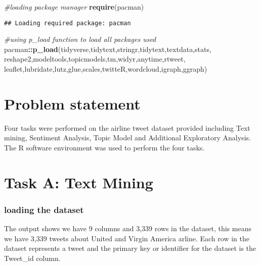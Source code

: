 \documentclass[
]{article}
\newenvironment{Shaded}{\begin{snugshade}}{\end{snugshade}}
\newcommand{\CommentTok}[1]{\textcolor[rgb]{0.56,0.35,0.01}{\textit{#1}}}
\newcommand{\KeywordTok}[1]{\textcolor[rgb]{0.13,0.29,0.53}{\textbf{#1}}}
\newcommand{\NormalTok}[1]{#1}
\newcommand{\OperatorTok}[1]{\textcolor[rgb]{0.81,0.36,0.00}{\textbf{#1}}}
\begin{document}
\begin{Shaded}
\begin{Highlighting}[]
\CommentTok{#loading package manager}
\KeywordTok{require}\NormalTok{(pacman)}
\end{Highlighting}
\end{Shaded}

\begin{verbatim}
## Loading required package: pacman
\end{verbatim}

\begin{Shaded}
\begin{Highlighting}[]
\CommentTok{#using p_load function to load all packages used}
\NormalTok{pacman}\OperatorTok{::}\KeywordTok{p_load}\NormalTok{(tidyverse,tidytext,stringr,tidytext,textdata,stats,}
\NormalTok{               reshape2,modeltools,topicmodels,tm,widyr,anytime,rtweet,}
\NormalTok{               leaflet,lubridate,lutz,glue,scales,twitteR,wordcloud,igraph,ggraph)}
\end{Highlighting}
\end{Shaded}

\hypertarget{problem-statement}{%
\section{Problem statement}\label{problem-statement}}

Four tasks were performed on the airline tweet dataset provided
including Text mining, Sentiment Analysis, Topic Model and Additional
Exploratory Analysis. The R software environment was used to perform the
four tasks.

\hypertarget{task-a-text-mining}{%
\section{Task A: Text Mining}\label{task-a-text-mining}}

\hypertarget{loading-the-dataset}{%
\subsubsection{loading the dataset}\label{loading-the-dataset}}

The output shows we have 9 columns and 3,339 rows in the dataset, this
means we have 3,339 tweets about United and Virgin America arline. Each
row in the dataset represents a tweet and the primary key or identifier
for the dataset is the Tweet\_id column.
\end{document}
